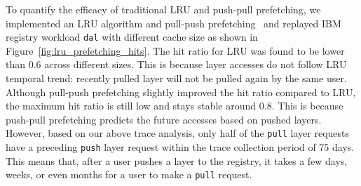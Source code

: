 To quantify the efficacy of traditional LRU and push-pull prefetching,
we implemented an LRU algorithm and pull-push prefetching~\cite{dockerworkload} 
and replayed 
IBM registry workload \texttt{dal} with different cache size as shown in 
Figure~\ref{fig:lru_prefetching_hits}.
The hit ratio for LRU was found to be lower than $0.6$ across different sizes.
This is because layer accesses do not follow LRU temporal trend:
recently pulled layer will not be pulled again by the same user.
Although pull-push prefetching slightly improved the hit ratio compared to LRU,
the maximum hit ratio is still low and stays stable around $0.8$.
This is because push-pull prefetching predicts the future accesses based on  
pushed layers.
However, based on our above trace analysis,
only half of the \texttt{pull} layer
requests have a preceding \texttt{push} layer request within the trace
collection period of 75 days. This means that, after a user pushes a layer
to the registry, it takes a few days, weeks, or even months for a user to make
a \texttt{pull} request. 




